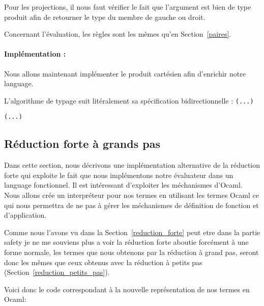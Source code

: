 \documentclass {article}
\newcommand{\codefrom}[3]
           {}
\theoremstyle{definition}
\theoremstyle{remark}
\begin{document}
Pour les projections, il nous faut vérifier le fait que l'argument est
bien de type produit afin de retourner le type du membre de gauche ou
droit.

Concernant l'évaluation, les règles sont les mêmes qu'en Section~\ref{paires}.

\paragraph{Implémentation :}
Nous allons maintenant implémenter le produit cartésien afin d'enrichir
notre language. 


L'algorithme de typage suit litéralement sa spécification bidirectionnelle :
%
\codefrom{typed}{lambda}{check_def}\lstinline!(...)!
\codefrom{typed}{lambda}{check_pair}
\codefrom{typed}{lambda}{synth_def}\lstinline!(...)!
\codefrom{typed}{lambda}{synth_pair}



\subsection{Réduction forte à grands pas}
\label{red_forte_grand_pas}

Dans cette section, nous décrivons une implémentation alternative de
la réduction forte qui exploite le fait que nous implémentons notre évaluateur dans un language fonctionnel.
Il est intéressant d'exploiter les méchanismes d'Ocaml. Nous allons crée un interpréteur pour nos termes
en utilisant les termes Ocaml ce qui nous permettra de ne pas à
gérer les méchanismes de définition de fonction et d'application.

Comme nous l'avons vu dans la Section~\ref{reduction_forte}  peut
etre dans la partie safety je ne me souviens plus a voir \fi la
réduction forte aboutie forcément à une forme normale, les termes que
nous obtenons par la réduction à grand pas, seront donc les mêmes que
ceux obtenus avec la réduction à petits pas
(Section~\ref{reduction_petits_pas}).

\newcommand{\VLam}{\lstinline!VLam!}
Voici donc le code correspondant à la nouvelle représentation de nos termes en Ocaml:

\codefrom{typed}{lambda}{value}
\codefrom{typed}{lambda}{neutral}
\end{document}
